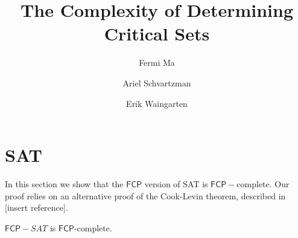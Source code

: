 \documentclass[runningheads,a4paper]{llncs}
\begin{document}
\mainmatter  %

\title{The Complexity of Determining Critical Sets}


%
%
\author{Fermi Ma \and Ariel Schvartzman \and Erik Waingarten}
%


%
%

\maketitle

\section{SAT}

In this section we show that the $\mathsf{FCP}$ version of SAT is $\mathsf{FCP}-$complete. Our proof relies on an alternative proof of the Cook-Levin theorem, described in [insert reference]. 

\begin{theorem}
$\mathsf{FCP}-SAT$ is $\mathsf{FCP}$-complete. 
\end{theorem} 
\end{document}
